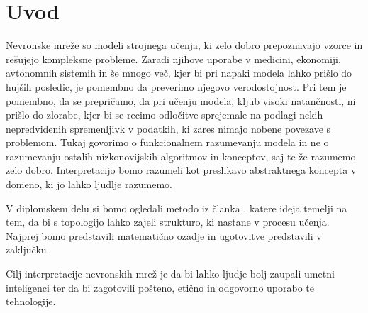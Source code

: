 \chapter{Uvod}
Nevronske mreže so modeli strojnega učenja, ki zelo dobro prepoznavajo vzorce in rešujejo kompleksne probleme. Zaradi njihove uporabe v medicini, ekonomiji, avtonomnih sistemih in še mnogo več, kjer bi pri napaki modela lahko prišlo do hujših posledic, je pomembno da preverimo njegovo verodostojnost. Pri tem je pomembno, da se prepričamo, da pri učenju modela, kljub visoki natančnosti, ni prišlo do zlorabe, kjer bi se recimo odločitve sprejemale na podlagi nekih nepredvidenih spremenljivk v podatkih, ki zares nimajo nobene povezave s problemom. Tukaj govorimo o funkcionalnem razumevanju modela in ne o razumevanju ostalih nizkonovijskih algoritmov in konceptov, saj te že razumemo zelo dobro. Interpretacijo bomo razumeli kot preslikavo abstraktnega koncepta v domeno, ki jo lahko ljudlje razumemo.\cite{MONTAVON20181}

V diplomskem delu si bomo ogledali metodo iz članka \cite{Gabella_2021}, katere ideja temelji na tem, da bi s topologijo lahko zajeli strukturo, ki nastane v procesu učenja. Najprej bomo predstavili matematično ozadje in ugotovitve predstavili v zaključku.

Cilj interpretacije nevronskih mrež je da bi lahko ljudje bolj zaupali umetni inteligenci ter da bi zagotovili pošteno, etično in odgovorno uporabo te tehnologije.

